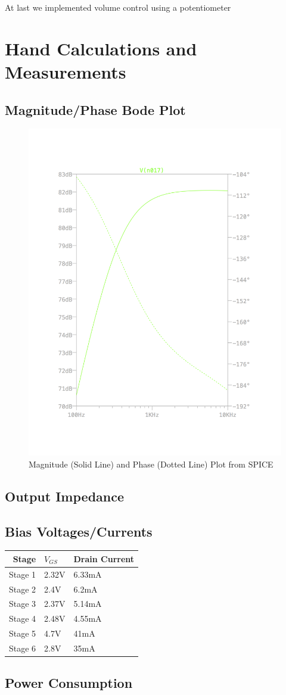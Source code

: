 \documentclass[11pt, twoside, letterpaper]{article}
\begin{document}
At last we implemented volume control using a potentiometer 

\section{Hand Calculations and Measurements}
\subsection*{Magnitude/Phase Bode Plot}
\begin{figure}[htbp]
\begin{center}
\includegraphics[width=7in]{MagPlot.png}
\caption{Magnitude (Solid Line) and Phase (Dotted Line) Plot from SPICE}
\end{center}
\end{figure}
\FloatBarrier

\subsection*{Output Impedance}
\subsection*{Bias Voltages/Currents}
\begin{tabular}{|r|l|l|}
\hline
Stage & $V_{GS}$ & Drain Current\\
\hline
Stage 1 &2.32V&6.33mA\\
Stage 2 &2.4V&6.2mA\\
Stage 3 &2.37V&5.14mA\\
Stage 4 &2.48V&4.55mA\\
Stage 5 &4.7V&41mA\\
Stage 6 &2.8V&35mA\\
\hline
\end{tabular}
\subsection*{Power Consumption}
\end{document}
